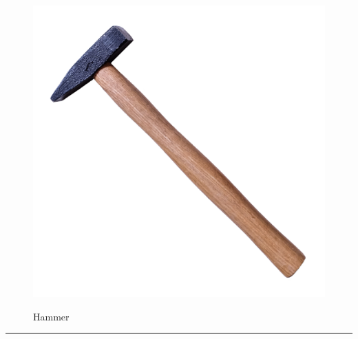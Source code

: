 \documentclass{article}
\begin{document}
    \begin{figure}[H]
        \centering
        \begin{minipage}{0.25\textwidth}
            \centering
            \includegraphics[width=\textwidth]{../SurvivalItemImages/hammer}
        \end{minipage}\hfill
        \begin{minipage}{0.7\textwidth}
            \centering
            \Large Hammer
        \end{minipage}
    \end{figure}
    \vspace{-0.8em}
    \noindent\rule{\textwidth}{0.4pt}
            
\end{document}

